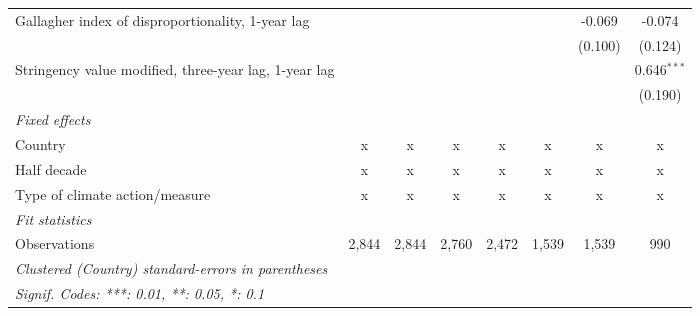 \begin{table}[htbp]
\begin{tabular}{lccccccc}
      Gallagher index of disproportionality, 1-year lag     &         &         &             &              &             & -0.069       & -0.074\\   
                                                            &         &         &             &              &             & (0.100)      & (0.124)\\   
      Stringency value modified, three-year lag, 1-year lag &         &         &             &              &             &              & 0.646$^{***}$\\   
                                                            &         &         &             &              &             &              & (0.190)\\   
      \emph{Fixed effects}\\
      Country                                               & x       & x       & x           & x            & x           & x            & x\\  
      Half decade                                           & x       & x       & x           & x            & x           & x            & x\\  
      Type of climate action/measure                        & x       & x       & x           & x            & x           & x            & x\\  
      \midrule \emph{Fit statistics}\\
      Observations                                          & 2,844   & 2,844   & 2,760       & 2,472        & 1,539       & 1,539        & 990\\  
      \midrule
      \multicolumn{8}{l}{\emph{Clustered (Country) standard-errors in parentheses}}\\
      \multicolumn{8}{l}{\emph{Signif. Codes: ***: 0.01, **: 0.05, *: 0.1}}\\
   \end{tabular}
\end{table}


